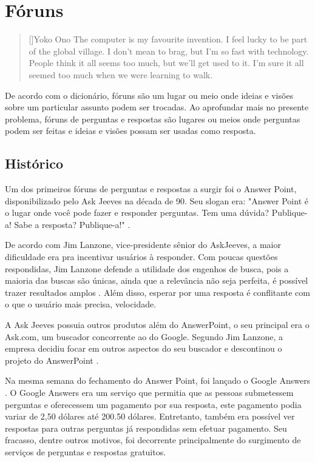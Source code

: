 \chapter{Fóruns}
\label{cap:forums}

\begin{quotation}[]{Yoko Ono}
The computer is my favourite invention. I feel lucky to be part of the global village. I don't mean to brag, but I'm so fast with technology. People think it all seems too much, but we'll get used to it. I'm sure it all seemed too much when we were learning to walk.
\end{quotation}

De acordo com o dicionário, fóruns são um lugar ou meio onde ideias e visões sobre um particular assunto podem ser trocadas. Ao aprofundar mais no presente problema, fóruns de perguntas e respostas são lugares ou meios onde perguntas podem ser feitas e ideias e visões possam ser usadas como resposta. 
\section{Histórico}
Um dos primeiros fóruns de perguntas e respostas a surgir foi o Answer Point, disponibilizado pelo Ask Jeeves na década de 90. Seu slogan era: "Answer Point é o lugar onde você pode fazer e responder perguntas. Tem uma dúvida? Publique-a! Sabe a resposta? Publique-a!" \cite{websearchhistory}.

 De acordo com Jim Lanzone, vice-presidente sênior do AskJeeves, a maior dificuldade era pra incentivar usuários à responder. Com poucas questões respondidas, Jim Lanzone defende a utilidade dos engenhos de busca, pois a maioria das buscas são únicas, ainda que a relevância não seja perfeita, é possível trazer resultados amplos \cite{websearchhistory}. Além disso, esperar por uma resposta é conflitante com o que o usuário mais precisa, velocidade. 

A Ask Jeeves possuia outros produtos além do AnswerPoint, o seu principal era o Ask.com, um buscador concorrente ao do Google. Segundo Jim Lanzone, a empresa decidiu focar em outros aspectos do seu buscador e descontinou o projeto do AnswerPoint \cite{websearchhistory}.

Na mesma semana do fechamento do Answer Point, foi lançado o Google Answers \cite{googleanswerswiki}. O Google Answers era um serviço que permitia que as pessoas submetessem perguntas e oferecessem um pagamento por sua resposta, este pagamento podia variar de 2,50 dólares até 200.50 dólares. Entretanto, também era possível ver respostas para outras perguntas já respondidas sem efetuar pagamento. Seu fracasso, dentre outros motivos, foi decorrente principalmente do surgimento de serviços de perguntas e respostas gratuitos.

